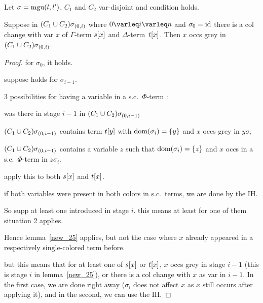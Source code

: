 \documentclass[,%
	paper=a4,%
	DIV11, %
	twoside=false,%
	liststotoc,
	bibtotoc,
	draft=false,%
	numbers=noendperiod
]{scrartcl}
\begin{document}
\begin{lemma}
	\label{new_27}
	Let $\sigma = \operatorname{mgu}(l, l')$, $C_1$ and $C_2$ var-disjoint and condition holds.


	Suppose in $(C_1 \cup C_2)\sigma_{(0,i)}$ where $0\varleq i \varleq n$ and $\sigma_0 = \operatorname{id}$ there is a col change with var $x$ of $\Gamma$-term $s[x]$ and $\Delta$-term~$t[x]$.
	Then $x$ occs grey in $(C_1 \cup C_2)\sigma_{(0,i)}$.
\end{lemma}
\begin{proof}
	for $\sigma_0$, it holds.

	suppose holds for $\sigma_{i-1}$.

	3 possibilities for having a variable in a s.c.\ $\Phi$-term :
	\begin{compactenum}
	\item was there in stage $i-1$ in $(C_1 \cup C_2)\sigma_{(0,i-1)}$
	\item $(C_1 \cup C_2)\sigma_{(0,i-1)}$ contains term $t[y]$ with $\operatorname{dom}(\sigma_i) = \{y\}$ and $x$ occs grey in $y\sigma_i$
	\item $(C_1 \cup C_2)\sigma_{(0,i-1)}$ contains a variable $z$ such that $\operatorname{dom}(\sigma_i) = \{z\}$ and $x$ occs in a s.c.\ $\Phi$-term in $z\sigma_i$.
	\end{compactenum}

	apply this to both $s[x]$ and $t[x]$.

	if both variables were present in both colors in s.c.\ terms, we are done by the IH.

	So supp at least one introduced in stage $i$.
	this means at least for one of them situation 2 applies. 

	Hence lemma~\ref{new_25} applies, but not the case where $x$ already appeared in a respectively single-colored term before.

	but this means that for at least one of $s[x]$ or $t[x]$, $x$ occs grey in stage $i-1$ (this is stage $i$ in lemma~\ref{new_25}), or there is a col change with $x$ as var in $i-1$. 
	In the first case, we are done right away ($\sigma_i$ does not affect $x$ as $x$ still occurs after applying it), and in the second, we can use the IH.
\end{proof}
\end{document}
